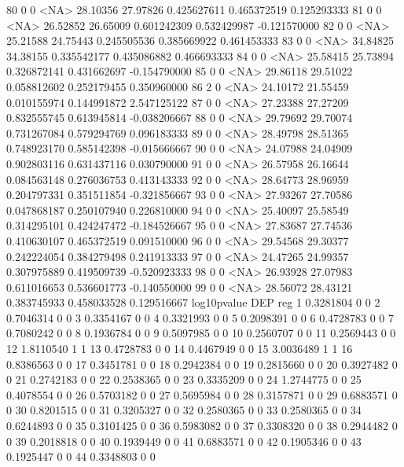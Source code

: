 \documentclass{beamer}
\begin{document}
\begin{frame}[fragile]
\begin{itemize}
\begin{Schunk}
\begin{Soutput}
80       0       0 <NA> 28.10356 27.97826 0.425627611 0.465372519  0.125293333
81       0       0 <NA> 26.52852 26.65009 0.601242309 0.532429987 -0.121570000
82       0       0 <NA> 25.21588 24.75443 0.245505536 0.385669922  0.461453333
83       0       0 <NA> 34.84825 34.38155 0.335542177 0.435086882  0.466693333
84       0       0 <NA> 25.58415 25.73894 0.326872141 0.431662697 -0.154790000
85       0       0 <NA> 29.86118 29.51022 0.058812602 0.252179455  0.350960000
86       2       0 <NA> 24.10172 21.55459 0.010155974 0.144991872  2.547125122
87       0       0 <NA> 27.23388 27.27209 0.832555745 0.613945814 -0.038206667
88       0       0 <NA> 29.79692 29.70074 0.731267084 0.579294769  0.096183333
89       0       0 <NA> 28.49798 28.51365 0.748923170 0.585142398 -0.015666667
90       0       0 <NA> 24.07988 24.04909 0.902803116 0.631437116  0.030790000
91       0       0 <NA> 26.57958 26.16644 0.084563148 0.276036753  0.413143333
92       0       0 <NA> 28.64773 28.96959 0.204797331 0.351511854 -0.321856667
93       0       0 <NA> 27.93267 27.70586 0.047868187 0.250107940  0.226810000
94       0       0 <NA> 25.40097 25.58549 0.314295101 0.424247472 -0.184526667
95       0       0 <NA> 27.83687 27.74536 0.410630107 0.465372519  0.091510000
96       0       0 <NA> 29.54568 29.30377 0.242224054 0.384279498  0.241913333
97       0       0 <NA> 24.47265 24.99357 0.307975889 0.419509739 -0.520923333
98       0       0 <NA> 26.93928 27.07983 0.611016653 0.536601773 -0.140550000
99       0       0 <NA> 28.56072 28.43121 0.383745933 0.458033528  0.129516667
   log10pvalue DEP reg
1    0.3281804   0   0
2    0.7046314   0   0
3    0.3354167   0   0
4    0.3321993   0   0
5    0.2098391   0   0
6    0.4728783   0   0
7    0.7080242   0   0
8    0.1936784   0   0
9    0.5097985   0   0
10   0.2560707   0   0
11   0.2569443   0   0
12   1.8110540   1   1
13   0.4728783   0   0
14   0.4467949   0   0
15   3.0036489   1   1
16   0.8386563   0   0
17   0.3451781   0   0
18   0.2942384   0   0
19   0.2815660   0   0
20   0.3927482   0   0
21   0.2742183   0   0
22   0.2538365   0   0
23   0.3335209   0   0
24   1.2744775   0   0
25   0.4078554   0   0
26   0.5703182   0   0
27   0.5695984   0   0
28   0.3157871   0   0
29   0.6883571   0   0
30   0.8201515   0   0
31   0.3205327   0   0
32   0.2580365   0   0
33   0.2580365   0   0
34   0.6244893   0   0
35   0.3101425   0   0
36   0.5983082   0   0
37   0.3308320   0   0
38   0.2944482   0   0
39   0.2018818   0   0
40   0.1939449   0   0
41   0.6883571   0   0
42   0.1905346   0   0
43   0.1925447   0   0
44   0.3348803   0   0

\end{Soutput}
\end{Schunk}
\end{itemize}
\end{frame}
\end{document}
